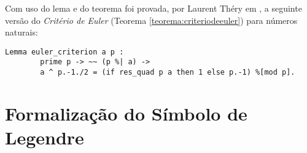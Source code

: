 \begin{enumerate}[label=\textbf{\roman*.}]
\begin{enumerate}[label=\textbf{\roman{enumi}.(\alph*)}]
\begin{enumerate}[label=\textbf{(\alph{enumii}.\arabic*)}]
                \end{enumerate}

        \end{enumerate}



\end{enumerate}

        Com uso do lema  e do teorema  foi provada, por Laurent Théry em \cite{mathcomp-extra-euler}, a seguinte versão do \textit{Critério de Euler} (Teorema \ref{teorema:criteriodeeuler}) para números naturais:
                \begin{lstlisting}[language=coq,frame=single,tabsize=1]
Lemma euler_criterion a p : 
        prime p -> ~~ (p %| a) -> 
        a ^ p.-1./2 = (if res_quad p a then 1 else p.-1) %[mod p].
                \end{lstlisting}


\section{Formalização do Símbolo de Legendre}
\label{sec:form-legendre}


